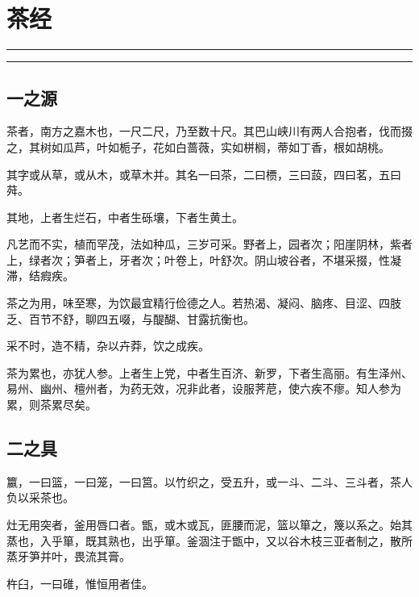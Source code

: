 \documentclass[]{article}
\date{}
\begin{document}
\hypertarget{header-n16}{%
\section{茶经}\label{header-n16}}

\begin{center}\rule{0.5\linewidth}{\linethickness}\end{center}

\tableofcontents

\begin{center}\rule{0.5\linewidth}{\linethickness}\end{center}

\hypertarget{header-n22}{%
\subsection{一之源}\label{header-n22}}

茶者，南方之嘉木也，一尺二尺，乃至数十尺。其巴山峡川有两人合抱者，伐而掇之，其树如瓜芦，叶如栀子，花如白蔷薇，实如栟榈，蒂如丁香，根如胡桃。

其字或从草，或从木，或草木并。其名一曰茶，二曰槚，三曰蔎，四曰茗，五曰荈。

其地，上者生烂石，中者生砾壤，下者生黄土。

凡艺而不实，植而罕茂，法如种瓜，三岁可采。野者上，园者次；阳崖阴林，紫者上，绿者次；笋者上，牙者次；叶卷上，叶舒次。阴山坡谷者，不堪采掇，性凝滞，结瘕疾。

茶之为用，味至寒，为饮最宜精行俭德之人。若热渴、凝闷、脑疼、目涩、四肢乏、百节不舒，聊四五啜，与醍醐、甘露抗衡也。

采不时，造不精，杂以卉莽，饮之成疾。

茶为累也，亦犹人参。上者生上党，中者生百济、新罗，下者生高丽。有生泽州、易州、幽州、檀州者，为药无效，况非此者，设服荠苨，使六疾不瘳。知人参为累，则茶累尽矣。

\hypertarget{header-n23}{%
\subsection{二之具}\label{header-n23}}

籝，一曰篮，一曰笼，一曰筥。以竹织之，受五升，或一斗、二斗、三斗者，茶人负以采茶也。

灶无用突者，釜用唇口者。甑，或木或瓦，匪腰而泥，篮以箪之，篾以系之。始其蒸也，入乎箪，既其熟也，出乎箪。釜涸注于甑中，又以谷木枝三亚者制之，散所蒸牙笋并叶，畏流其膏。

杵臼，一曰碓，惟恒用者佳。
\end{document}
